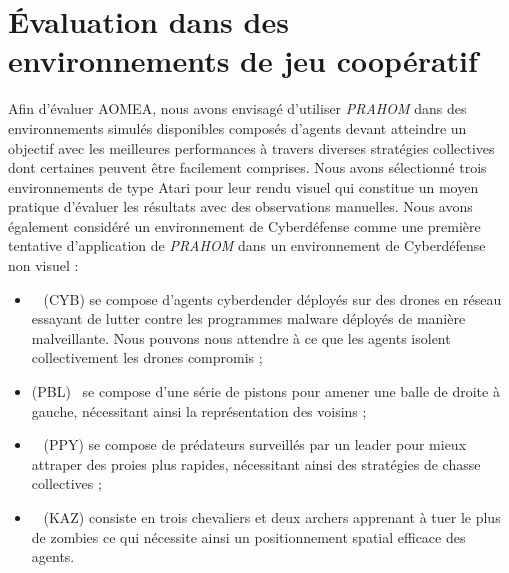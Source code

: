 \documentclass[contribution]{jfsma}
\begin{document}

\section{Évaluation dans des environnements de jeu coopératif}


Afin d'évaluer AOMEA, nous avons envisagé d'utiliser \emph{PRAHOM} dans des environnements simulés disponibles composés d'agents devant atteindre un objectif avec les meilleures performances à travers diverses stratégies collectives dont certaines peuvent être facilement comprises.
Nous avons sélectionné trois environnements de type Atari pour leur rendu visuel qui constitue un moyen pratique d'évaluer les résultats avec des observations manuelles\footnotemark[1].
Nous avons également considéré un environnement de Cyberdéfense comme une première tentative d'application de \emph{PRAHOM} dans un environnement de Cyberdéfense non visuel :


\begin{itemize}
  \item {}~\cite{cage_challenge_3_announcement} (CYB) se compose d'agents cyberdender déployés sur des drones en réseau essayant de lutter contre les programmes malware déployés de manière malveillante. Nous pouvons nous attendre à ce que les agents \allowbreak isolent collectivement les drones compromis ;
  \item {} (PBL)~\cite{Terry2021} se compose d'une série de pistons pour amener une balle de droite à gauche, nécessitant ainsi la représentation des voisins ;
  \item {}~\cite{Lowe2017} (PPY) se compose de prédateurs surveillés par un leader pour mieux attraper des proies plus rapides, nécessitant ainsi des stratégies de chasse collectives ;
  \item {}~\cite{Terry2021} (KAZ) consiste en trois chevaliers et deux archers apprenant à tuer le plus de zombies ce qui nécessite ainsi un positionnement spatial efficace des agents.
\end{itemize}
\end{document}

